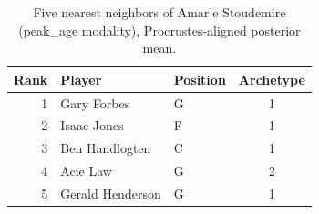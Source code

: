 \begin{table}[htbp]
  \centering\small
  \begin{tabular}{rllc}
    \toprule
    Rank & Player & Position & Archetype \\
    \midrule
    1 & Gary Forbes & G & 1 \\
    2 & Isaac Jones & F & 1 \\
    3 & Ben Handlogten & C & 1 \\
    4 & Acie Law & G & 2 \\
    5 & Gerald Henderson & G & 1 \\
    \bottomrule
  \end{tabular}
  \caption{Five nearest neighbors of Amar'e Stoudemire (peak_age modality), Procrustes-aligned posterior mean.}
  \label{tab:Amar_e_Stoudemire_neighbors_peak_age}
\end{table}

